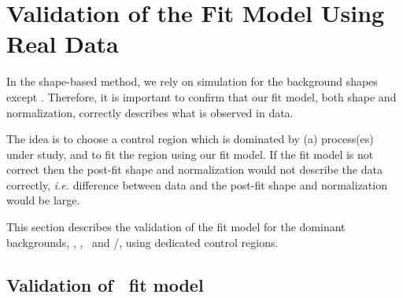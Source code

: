


\section{Validation of the Fit Model Using Real Data}

In the shape-based method, we rely on simulation for the background shapes 
except \Wjets. Therefore, it is important to confirm that our fit model,
both shape and normalization, correctly describes what is observed in data. 

The idea is to choose a control region which is dominated by (a) process(es) 
under study, and to fit the region using our fit model.  
If the fit model is not correct then the post-fit shape 
and normalization would not describe the data correctly, 
\textit{i.e.} difference between data and the post-fit shape and normalization
would be large. 

This section describes the validation of the fit model for the dominant backgrounds, 
\qqww, \topbkg, \Wjets\ and \wgamma/\wgammastar, using dedicated control regions. 

\subsection{Validation of \qqww\ fit model}  
\label{subsec:valqqww}

